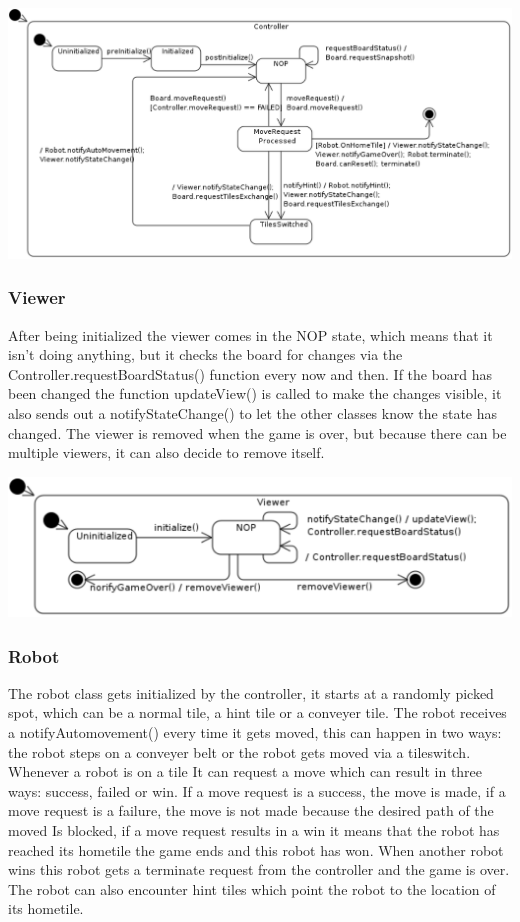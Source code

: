 	\includegraphics[width=\linewidth]{statecharts/controller.pdf}

	\subsubsection{Viewer}
	After being initialized the viewer comes in the NOP state, which means that it isn't doing anything, but it checks the board for changes via the Controller.requestBoardStatus() function every now and then. If the board has been changed the function updateView() is called to make the changes visible, it also sends out a notifyStateChange() to let the other classes know the state has changed. The viewer is removed when the game is over, but because there can be multiple viewers, it can also decide to remove itself.
	
	\includegraphics[width=\linewidth]{statecharts/view.pdf}

	\subsubsection{Robot}
	The robot class gets initialized by the controller, it starts at a randomly picked spot, which can be a normal tile, a hint tile or a conveyer tile. The robot receives a notifyAutomovement() every time it gets moved, this can happen in two ways: the robot steps on a conveyer belt or the robot gets moved via a tileswitch. Whenever a robot is on a tile It can request a move which can result in three ways: success, failed or win. If a move request is a success, the move is made, if a move request is a failure, the move is not made because the desired path of the moved Is blocked, if a move request results in a win it means that the robot has reached its hometile the game ends and this robot has won. When another robot wins this robot gets a terminate request from the controller and the game is over. The robot can also encounter hint tiles which point the robot to the location of its hometile.
	
